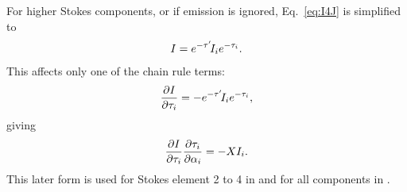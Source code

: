 For higher Stokes components, or if emission is ignored, Eq.~\ref{eq:I4J} is
simplified to
\begin{equation}
  \label{eq:Q4J}
  I = e^{-\tau'}\!I_{i}e^{-\tau_{i}}.
\end{equation}
This affects only one of the chain rule terms:
\begin{equation}
  \frac{\partial I}{\partial\tau_{i}} 
      = -e^{-\tau'}\!I_{i}e^{-\tau_{i}},
\end{equation}
giving
\begin{equation}
  \frac{\partial I}{\partial\tau_{i}}\frac{\partial\tau_{i}}{\partial{\alpha}_{i}} =
  -X I_{i}.
\end{equation}
This later form is used for Stokes element 2 to 4 in
 and for all components in
.


